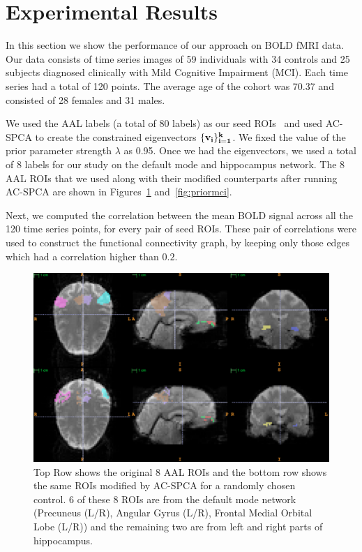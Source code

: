 \documentclass{llncs}
\begin{document}
\section{Experimental Results}
In this section we show the performance of our approach on BOLD fMRI data. Our data consists of time series images of 59 individuals with 34 controls and 25 subjects diagnosed clinically with Mild Cognitive Impairment (MCI).  Each time series had a total of 120 points. The average age of the cohort was 70.37 and consisted of 28 females and 31 males.

We used the AAL labels (a total of 80 labels) as our seed ROIs~\cite{tzourio2002automated} and used AC-SPCA to create the constrained eigenvectors $\{\bf v_i\}_{i=1}^k$. We fixed the value of the prior parameter strength $\lambda$ as 0.95. Once we had the eigenvectors,  we used a total of 8 labels for our study on the default mode and hippocampus network. The 8 AAL ROIs that we used along with their modified counterparts after running AC-SPCA are shown in Figures~\ref{fig:priorcontrol} and~\ref{fig:priormci}.



Next, we computed the correlation between the mean BOLD signal across all the 120 time series points, for every pair of seed ROIs. These pair of correlations were used to construct the functional connectivity graph, by keeping only those edges which had a correlation higher than $0.2$. 


\begin{figure}
\begin{center}
\includegraphics[width=1\linewidth]{aalvspca_control101.pdf} 
\end{center}
\vspace{-0.2in}
\caption{Top Row shows the original  8 AAL ROIs and the bottom row shows the same ROIs modified by AC-SPCA for a randomly chosen control. 6 of these 8 ROIs are from the default mode network (Precuneus (L/R), Angular Gyrus (L/R), Frontal Medial Orbital Lobe (L/R)) and the remaining two are from left and right parts of hippocampus. }
\label{fig:priorcontrol}
\end{figure}
\end{document}
